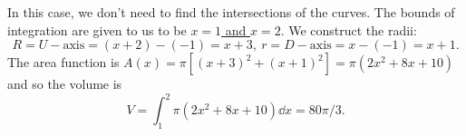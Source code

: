 \documentclass[12pt]{article}
\theoremstyle{plain}
\theoremstyle{definition}
\theoremstyle{remark}
\renewcommand{\:}{\colon}           %
\newcommand{\un}[1]{\underline{#1}}
\renewcommand{\.}{\Cdot}                %
\begin{document}
\begin{ptcb}
\begin{center}
\begin{tikzpicture}[x=0.75pt,y=0.75pt,yscale=-1,xscale=1]
  
  \end{tikzpicture}
  
\end{center}
In this case, we don't need to find the intersections of the curves. The bounds of integration are given to us to be \un{$x=1$ and $x=2$}. We construct the radii:
$$R=U-\text{axis}=(x+2)-(-1)=x+3,\ r=D-\text{axis}=x-(-1)=x+1.$$
The area function is $A(x)=\pi[(x+3)^2+(x+1)^2]=\pi(2 x^2 + 8 x + 10)$ and so the volume is 
$$V=\int_1^2\pi(2 x^2 + 8 x + 10)\dd x=80\pi/3.$$
\end{ptcb}

\end{document}
